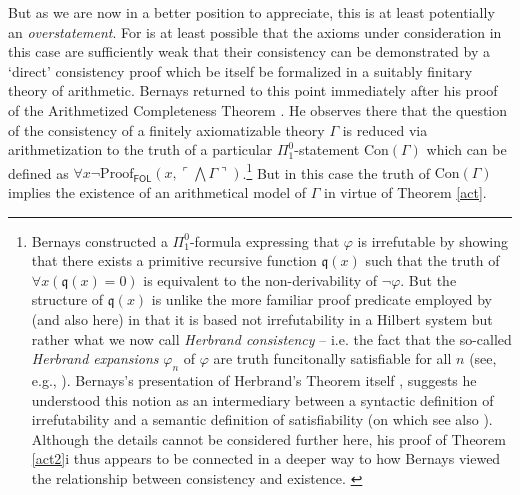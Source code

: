 \documentclass[11pt,fleqn,leqno]{article}
\def\phi{\varphi}
\def\A{\forall}
\begin{document}
But as we are now in a better position to appreciate, this is at least potentially an \textsl{overstatement}.   For is at least possible that the axioms under consideration in this case are sufficiently weak that their consistency can be demonstrated by a `direct' consistency proof which be itself be formalized in a suitably finitary theory of arithmetic.   Bernays returned to this point immediately after his proof of the Arithmetized Completeness Theorem \citeyearpar[p. 253]{Hilbert1939}.   He observes there that the question of the consistency of a finitely axiomatizable theory $\Gamma$ is reduced via arithmetization to the truth of a particular  $\Pi^0_1$-statement $\mathrm{Con}(\Gamma)$ which can be defined as $\A x \neg \mathrm{Proof}_{\mathsf{FOL}}(x,\ulcorner \bigwedge \Gamma \urcorner)$.\footnote{Bernays constructed a $\Pi^0_1$-formula expressing that $\phi$ is irrefutable by showing that there exists a primitive recursive function $\mathfrak{q}(x)$ such that the truth of $\A x (\mathfrak{q}(x) = 0)$ is equivalent to the non-derivability of $\neg \phi$.   But the structure of $\mathfrak{q}(x)$ is unlike the more familiar proof predicate employed by \citet{Godel1931a} (and also here) in that it is based not irrefutability in a Hilbert system but rather what we now call \textsl{Herbrand consistency} -- i.e. the fact that the so-called \textsl{Herbrand expansions} $\phi_n$ of $\phi$ are truth funcitonally satisfiable for all $n$ (see, e.g., \citealp[\S III.3c]{Hajek1998}). Bernays's presentation of Herbrand's Theorem itself \citeyearpar[\S III.3]{Hilbert1939},  suggests he understood this notion as an intermediary between a syntactic definition of irrefutability and a semantic definition of satisfiability (on which see also \citealp{Franks2009}).  Although the details cannot be considered further here, his proof of Theorem \ref{act2}i \citeyearpar[\S 4.2]{Hilbert1939} thus appears to be connected in a deeper way to how Bernays viewed the relationship between consistency and existence. \label{herbrandnote}} But in this case the truth of $\mathrm{Con}(\Gamma)$ implies the existence of an arithmetical model of $\Gamma$ in virtue of Theorem \ref{act}. 
\end{document}
